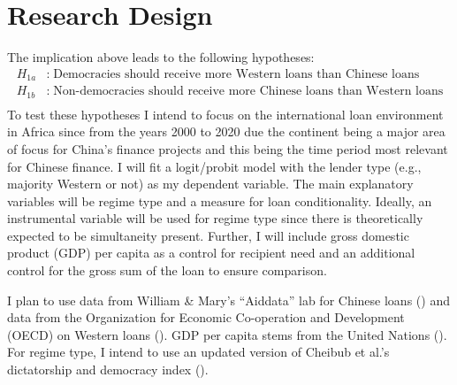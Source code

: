 \documentclass{article}
\begin{document}
\section*{Research Design}
The implication above leads to the following hypotheses:
\begin{align*}
    H_{1a}&:\;\text{Democracies should receive more Western loans than Chinese loans}\\
    H_{1b}&:\;\text{Non-democracies should receive more Chinese loans than Western loans}\\
\end{align*}
To test these hypotheses I intend to focus on the international loan environment in Africa since from the years 2000 to 2020 due the continent being a major area of focus for China's finance projects and this being the time period most relevant for Chinese finance. I will fit a logit/probit model with the lender type (e.g., majority Western or not) as my dependent variable. The main explanatory variables will be regime type and a measure for loan conditionality. Ideally, an instrumental variable will be used for regime type since there is theoretically expected to be simultaneity present. Further, I will include gross domestic product (GDP) per capita as a control for recipient need and an additional control for the gross sum of the loan to ensure comparison.

I plan to use data from William \& Mary's ``Aiddata'' lab for Chinese loans (\cite{custer2021}) and data from the Organization for Economic Co-operation and Development (OECD) on Western loans (\cite{organizationforeconomicco-operationanddevelopment2022a}). GDP per capita stems from the United Nations (\cite{unitednationsstatisticsdivision2019}). For regime type, I intend to use an updated version of Cheibub et al.'s dictatorship and democracy index (\cite{cheibub2010}).

\nocite{curini2020}
\pagebreak
\printbibliography
\end{document}
